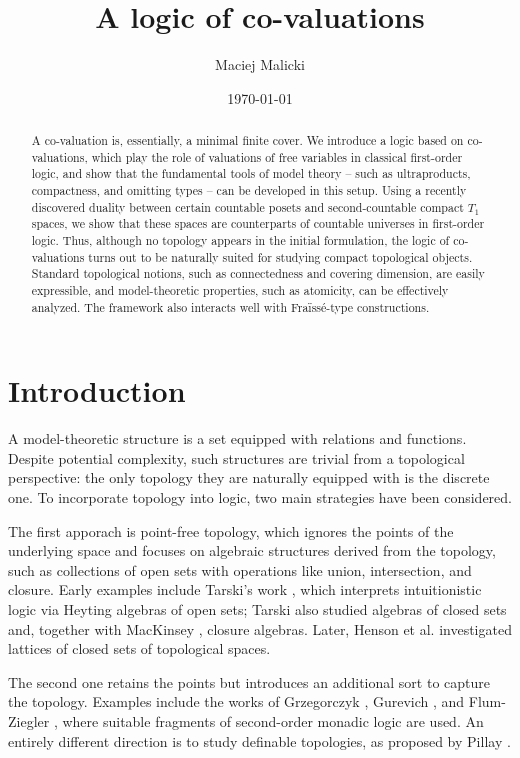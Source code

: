 \documentclass[12pt]{amsart}
\title{A logic of co-valuations}
\author[M. Malicki]{Maciej Malicki}
\date{\today}
\theoremstyle{plain}
\newcommand \fra{Fra\"{i}ss\'{e}}
\begin{document}
	\maketitle
	
\begin{abstract}
A co-valuation is, essentially, a minimal finite cover. We introduce a logic based on co-valuations, which play the role of valuations of free variables in classical first-order logic, and show that the fundamental tools of model theory -- such as ultraproducts, compactness, and omitting types -- can be developed in this setup. Using a recently discovered duality between certain countable posets and second-countable compact $T_1$ spaces, we show that these spaces are counterparts of countable universes in first-order logic. Thus, although no topology appears in the initial formulation, the logic of co-valuations turns out to be naturally suited for studying compact topological objects. Standard topological notions, such as connectedness and covering dimension, are easily expressible, and model-theoretic properties, such as atomicity, can be effectively analyzed. The framework also interacts well with \fra-type constructions.
\end{abstract}
	
	\newcommand{\refiningvia}{\pi_1``}

\section{Introduction}
A model-theoretic structure is a set equipped with relations and functions. Despite potential complexity, such structures are trivial from a topological perspective: the only topology they are naturally equipped with is the discrete one. To incorporate topology into logic, two main strategies have been considered.

The first apporach  is point-free topology, which ignores the points of the underlying space and focuses on algebraic structures derived from the topology, such as collections of open sets with operations like union, intersection, and closure. Early examples include Tarski’s work \cite{Ta}, which interprets intuitionistic logic via Heyting algebras of open sets; Tarski also studied algebras of closed sets and, together with MacKinsey \cite{MKTa}, closure algebras. Later, Henson et al. \cite{Heatal} investigated lattices of closed sets of topological spaces.

The second one retains the points but introduces an additional sort to capture the topology. Examples include the works of Grzegorczyk \cite{Gr}, Gurevich \cite{Gu}, and Flum-Ziegler \cite{FlZi}, where suitable fragments of second-order monadic logic are used. An entirely different direction is to study definable topologies, as proposed by Pillay \cite{Pi}.
\end{document}
